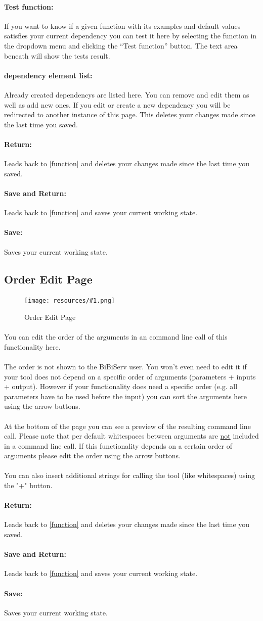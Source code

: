 \documentclass[a4paper,10pt]{book}
\newcommand{\bigpic}[1]{\texttt{[image: resources/\#1.png]}}
\newcommand{\buttonsDetail}[1]{
\paragraph{Return:} Leads back to #1 and deletes your changes made since the last time you saved.
\paragraph{Save and Return:} Leads back to #1 and saves your current working state.
\paragraph{Save:} Saves your current working state.
}
\newcommand{\newElem}[2]{
\paragraph{#1 element list:} Already created #1s are listed here. You can remove and edit them as well as add new ones. If you edit or create a new #1 you will be redirected to #2. This deletes your changes made since the last time you saved.
}
\begin{document}
\paragraph{Test function:} If you want to know if a given function with its examples and default values satisfies your current dependency you can test it here by selecting the function in the dropdown menu and clicking the ``Test function'' button. The text area beneath will show the tests result.
\newElem{dependency}{another instance of this page}
\buttonsDetail{\ref{function}}

\subsection{Order Edit Page}
\label{order}

\begin{figure}
 \bigpic{order}
 \caption{Order Edit Page}
\end{figure}

\paragraph{}You can edit the order of the arguments in an command line call of this functionality here.
\paragraph{}The order is not shown to the BiBiServ user. You won't even need to edit it if your tool does not depend on a specific order of arguments (parameters + inputs + output). However if your functionality does need a specific order (e.g. all parameters have to be used before the input) you can sort the arguments here using the arrow buttons.
\paragraph{}At the bottom of the page you can see a preview of the resulting command line call. Please note that per default whitespaces between arguments are \underline{not} included in a command line call. If this functionality depends on a certain order of arguments  please edit the order using the arrow buttons.
\paragraph{}You can also insert additional strings for calling the tool (like whitespaces) using the "+" button.

\buttonsDetail{\ref{function}}
\end{document}
